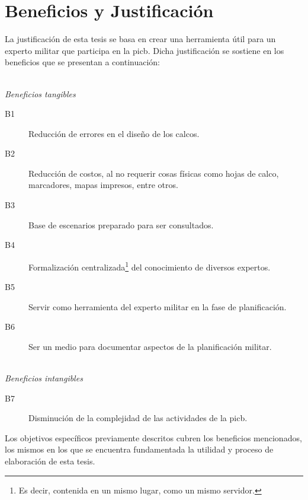 \section{Beneficios y Justificación}

La justificación de esta tesis se basa en crear una herramienta útil para un experto militar que participa en la \gls{picb}. Dicha justificación se sostiene en los beneficios que se presentan a continuación:

\ \\
\emph{\footnotesize Beneficios tangibles}
\begin{description}
\item[B1] Reducción de errores en el diseño de los calcos.
\item[B2] Reducción de costos, al no requerir cosas físicas como hojas de calco, marcadores, mapas impresos, entre otros.
\item[B3] Base de escenarios preparado para ser consultados.
\item[B4] Formalización centralizada\footnote{Es decir, contenida en un mismo lugar, como un mismo servidor.}  del conocimiento de diversos expertos.
\item[B5] Servir como herramienta del experto militar en la fase de planificación.
\item[B6] Ser un medio para documentar aspectos de la planificación militar.
\end{description}

\ \\
\emph{\footnotesize Beneficios intangibles}
\begin{description}
\item[B7] Disminución de la complejidad de las actividades de la \gls{picb}.
\end{description}

Los objetivos específicos previamente descritos cubren los beneficios mencionados, los mismos en los que se encuentra fundamentada la utilidad y proceso de elaboración de esta tesis.


